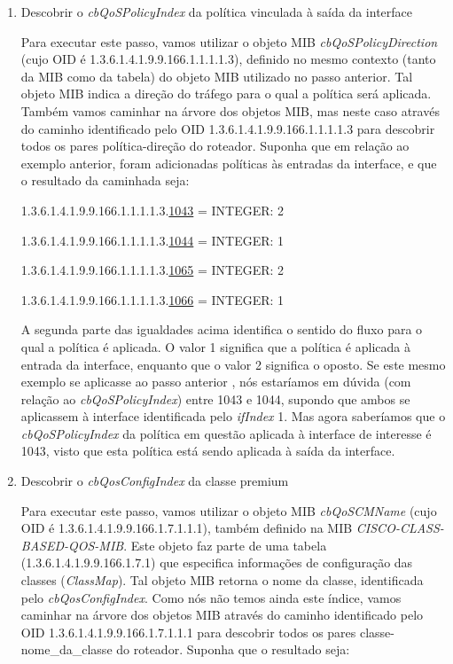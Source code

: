 \begin{enumerate}
\item Descobrir o \textit{cbQoSPolicyIndex} da política vinculada à saída da interface

	Para executar este passo, vamos utilizar o objeto MIB \textit{cbQoSPolicyDirection} (cujo OID é 1.3.6.1.4.1.9.9.166.1.1.1.1.3), definido no mesmo contexto (tanto da MIB como da tabela) do objeto MIB utilizado no passo anterior. Tal objeto MIB indica a direção do tráfego para o qual a política será aplicada. Também vamos caminhar na árvore dos objetos MIB, mas neste caso através do caminho identificado pelo OID 1.3.6.1.4.1.9.9.166.1.1.1.1.3 para descobrir todos os pares política-direção do roteador. Suponha que em relação ao exemplo anterior, foram adicionadas políticas às entradas da interface, e que o resultado da caminhada seja:
	
1.3.6.1.4.1.9.9.166.1.1.1.1.3.\underline{1043} = INTEGER: 2

1.3.6.1.4.1.9.9.166.1.1.1.1.3.\underline{1044} = INTEGER: 1

1.3.6.1.4.1.9.9.166.1.1.1.1.3.\underline{1065} = INTEGER: 2

1.3.6.1.4.1.9.9.166.1.1.1.1.3.\underline{1066} = INTEGER: 1

A segunda parte das igualdades acima identifica o sentido do fluxo para o qual a política é aplicada. O valor 1 significa que a política é aplicada à entrada da interface, enquanto que o valor 2 significa o oposto. Se este mesmo exemplo se aplicasse ao passo anterior , nós estaríamos em dúvida (com relação ao \textit{cbQoSPolicyIndex}) entre 1043 e 1044, supondo que ambos se aplicassem à interface identificada pelo \textit{ifIndex} 1. Mas agora saberíamos que o \textit{cbQoSPolicyIndex} da política em questão aplicada à interface de interesse é 1043, visto que esta política está sendo aplicada à saída da interface.
		
\item Descobrir o \textit{cbQosConfigIndex} da classe premium

Para executar este passo, vamos utilizar o objeto MIB \textit{cbQoSCMName} (cujo OID é 1.3.6.1.4.1.9.9.166.1.7.1.1.1), também definido na MIB \textit{CISCO-CLASS-BASED-QOS-MIB}. Este objeto faz parte de uma tabela (1.3.6.1.4.1.9.9.166.1.7.1) que especifica informações de configuração das classes (\textit{ClassMap}). Tal objeto MIB retorna o nome da classe, identificada pelo \textit{cbQosConfigIndex}. Como nós não temos ainda este índice, vamos caminhar na árvore dos objetos MIB através do caminho identificado pelo OID 1.3.6.1.4.1.9.9.166.1.7.1.1.1 para descobrir todos os pares classe-nome\_da\_classe do roteador. Suponha que o resultado seja:


\end{enumerate}
